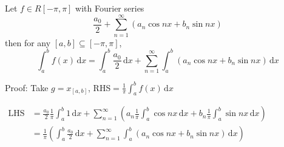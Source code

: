 \begin{corollary}
    Let $f\in R[-\pi,\pi]$ with Fourier series
    $$\frac{a_0}{2}+\sum_{n=1}^{\infty}\left(a_n\cos nx+b_n\sin nx\right)$$
    then for any $[a,b]\subseteq[-\pi,\pi]$,
    $$\int_a^b f(x)\,\mathrm{d}x=\int_a^b\frac{a_0}{2}\,\mathrm{d}x+\sum_{n=1}^{\infty}\int_a^b\left(a_n\cos nx+b_n\sin nx\right)\,\mathrm{d}x$$
\end{corollary}

Proof: Take $g=x_{[a,b]}$, RHS$=\frac{1}{\pi}\int_a^b f(x)\,\mathrm{d}x$

$\begin{aligned}
        \text{LHS} & =\frac{a_0}{2}\frac{1}{\pi}\int_a^b 1\,\mathrm{d}x+\sum_{n=1}^{\infty}\left(a_n\frac{1}{\pi}\int_a^b\cos nx\,\mathrm{d}x+b_n\frac{1}{\pi}\int_a^b\sin nx\,\mathrm{d}x\right) \\
                   & =\frac{1}{\pi}\left(\int_a^b\frac{a_0}{2}\,\mathrm{d}x+\sum_{n=1}^{\infty}\int_a^b\left(a_n\cos nx+b_n\sin nx\right)\,\mathrm{d}x\right)
    \end{aligned}$

